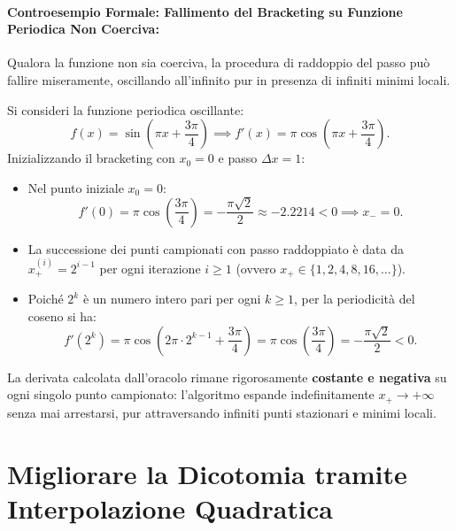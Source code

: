 \paragraph{Controesempio Formale: Fallimento del Bracketing su Funzione Periodica Non Coerciva:}
Qualora la funzione non sia coerciva, la procedura di raddoppio del passo pu\`o fallire miseramente, oscillando all'infinito pur in presenza di infiniti minimi locali.
\begin{example}
Si consideri la funzione periodica oscillante:
\begin{equation}
    f(x) = \sin\left(\pi x + \frac{3\pi}{4}\right) \implies f'(x) = \pi \cos\left(\pi x + \frac{3\pi}{4}\right).
    \label{eq:counterexample-periodic-function}
\end{equation}
Inizializzando il bracketing con $x_0 = 0$ e passo $\Delta x = 1$:
\begin{itemize}
    \item Nel punto iniziale $x_0 = 0$:
    \begin{equation}
        f'(0) = \pi \cos\left(\frac{3\pi}{4}\right) = -\frac{\pi \sqrt{2}}{2} \approx -2.2214 < 0 \implies x_- = 0.
    \end{equation}
    \item La successione dei punti campionati con passo raddoppiato \`e data da $x_+^{(i)} = 2^{i-1}$ per ogni iterazione $i \ge 1$ (ovvero $x_+ \in \{1, 2, 4, 8, 16, \dots\}$).
    \item Poich\'e $2^k$ \`e un numero intero pari per ogni $k \ge 1$, per la periodicit\`a del coseno si ha:
    \begin{equation}
        f'(2^k) = \pi \cos\left(2\pi \cdot 2^{k-1} + \frac{3\pi}{4}\right) = \pi \cos\left(\frac{3\pi}{4}\right) = -\frac{\pi \sqrt{2}}{2} < 0.
    \end{equation}
\end{itemize}
La derivata calcolata dall'oracolo rimane rigorosamente \textbf{costante e negativa} su ogni singolo punto campionato: l'algoritmo espande indefinitamente $x_+ \to +\infty$ senza mai arrestarsi, pur attraversando infiniti punti stazionari e minimi locali.
\end{example}

\FloatBarrier
\section{Migliorare la Dicotomia tramite Interpolazione Quadratica}
\label{sec:univariata-interpolazione-quadratica}

